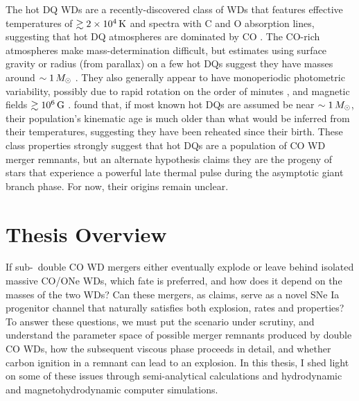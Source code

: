 The hot DQ WDs are a recently-discovered class of WDs that features effective temperatures of $\gtrsim2\times10^4\,\mathrm{K}$ and spectra with C and O absorption lines, suggesting that hot DQ atmospheres are dominated by CO \citep{dufo+07, dufo+08}.  The CO-rich atmospheres make mass-determination difficult, but estimates using surface gravity or radius (from parallax) on a few hot DQs suggest they have masses around $\sim1\,\Msun$ \citep{dufo+11, dunl15thesis}.  They also generally appear to have monoperiodic photometric variability, possibly due to rapid rotation on the order of minutes \citep{lawr+13, will+16}, and magnetic fields $\gtrsim10^6\,\mathrm{G}$ \citep{dufo+13}.  \cite{dunlc15} found that, if most known hot DQs are assumed be near $\sim1\,\Msun$, their population's kinematic age is much older than what would be inferred from their temperatures, suggesting they have been reheated since their birth.  These class properties strongly suggest that hot DQs are a population of CO WD merger remnants, but an alternate hypothesis \citep{dufo+07, alth+09} claims they are the progeny of stars that experience a powerful late thermal pulse during the asymptotic giant branch phase.  For now, their origins remain unclear.


\section{Thesis Overview}


If sub-\Mch\ double CO WD mergers either eventually explode or leave behind isolated massive CO/ONe WDs, which fate is preferred, and how does it depend on the masses of the two WDs?  Can these mergers, as \citeal{vkercj10} claims, serve as a novel SNe Ia progenitor channel that naturally satisfies both explosion, rates and properties?  To answer these questions, we must put the \citeal{vkercj10} scenario under scrutiny, and understand the parameter space of possible merger remnants produced by double CO WDs, how the subsequent viscous phase proceeds in detail, and whether carbon ignition in a remnant can lead to an explosion.  In this thesis, I shed light on some of these issues through semi-analytical calculations and hydrodynamic and magnetohydrodynamic computer simulations.

